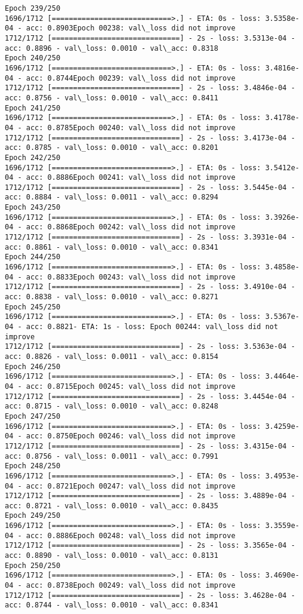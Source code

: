 \documentclass[11pt]{article}
\begin{document}
\begin{Verbatim}[commandchars=\\\{\}]
Epoch 239/250
1696/1712 [============================>.] - ETA: 0s - loss: 3.5358e-04 - acc: 0.8903Epoch 00238: val\_loss did not improve
1712/1712 [==============================] - 2s - loss: 3.5313e-04 - acc: 0.8896 - val\_loss: 0.0010 - val\_acc: 0.8318
Epoch 240/250
1696/1712 [============================>.] - ETA: 0s - loss: 3.4816e-04 - acc: 0.8744Epoch 00239: val\_loss did not improve
1712/1712 [==============================] - 2s - loss: 3.4846e-04 - acc: 0.8756 - val\_loss: 0.0010 - val\_acc: 0.8411
Epoch 241/250
1696/1712 [============================>.] - ETA: 0s - loss: 3.4178e-04 - acc: 0.8785Epoch 00240: val\_loss did not improve
1712/1712 [==============================] - 2s - loss: 3.4173e-04 - acc: 0.8785 - val\_loss: 0.0010 - val\_acc: 0.8201
Epoch 242/250
1696/1712 [============================>.] - ETA: 0s - loss: 3.5412e-04 - acc: 0.8886Epoch 00241: val\_loss did not improve
1712/1712 [==============================] - 2s - loss: 3.5445e-04 - acc: 0.8884 - val\_loss: 0.0011 - val\_acc: 0.8294
Epoch 243/250
1696/1712 [============================>.] - ETA: 0s - loss: 3.3926e-04 - acc: 0.8868Epoch 00242: val\_loss did not improve
1712/1712 [==============================] - 2s - loss: 3.3931e-04 - acc: 0.8861 - val\_loss: 0.0010 - val\_acc: 0.8341
Epoch 244/250
1696/1712 [============================>.] - ETA: 0s - loss: 3.4858e-04 - acc: 0.8833Epoch 00243: val\_loss did not improve
1712/1712 [==============================] - 2s - loss: 3.4910e-04 - acc: 0.8838 - val\_loss: 0.0010 - val\_acc: 0.8271
Epoch 245/250
1696/1712 [============================>.] - ETA: 0s - loss: 3.5367e-04 - acc: 0.8821- ETA: 1s - loss: Epoch 00244: val\_loss did not improve
1712/1712 [==============================] - 2s - loss: 3.5363e-04 - acc: 0.8826 - val\_loss: 0.0011 - val\_acc: 0.8154
Epoch 246/250
1696/1712 [============================>.] - ETA: 0s - loss: 3.4464e-04 - acc: 0.8715Epoch 00245: val\_loss did not improve
1712/1712 [==============================] - 2s - loss: 3.4454e-04 - acc: 0.8715 - val\_loss: 0.0010 - val\_acc: 0.8248
Epoch 247/250
1696/1712 [============================>.] - ETA: 0s - loss: 3.4259e-04 - acc: 0.8750Epoch 00246: val\_loss did not improve
1712/1712 [==============================] - 2s - loss: 3.4315e-04 - acc: 0.8756 - val\_loss: 0.0011 - val\_acc: 0.7991
Epoch 248/250
1696/1712 [============================>.] - ETA: 0s - loss: 3.4953e-04 - acc: 0.8721Epoch 00247: val\_loss did not improve
1712/1712 [==============================] - 2s - loss: 3.4889e-04 - acc: 0.8721 - val\_loss: 0.0010 - val\_acc: 0.8435
Epoch 249/250
1696/1712 [============================>.] - ETA: 0s - loss: 3.3559e-04 - acc: 0.8886Epoch 00248: val\_loss did not improve
1712/1712 [==============================] - 2s - loss: 3.3565e-04 - acc: 0.8890 - val\_loss: 0.0010 - val\_acc: 0.8131
Epoch 250/250
1696/1712 [============================>.] - ETA: 0s - loss: 3.4690e-04 - acc: 0.8738Epoch 00249: val\_loss did not improve
1712/1712 [==============================] - 2s - loss: 3.4628e-04 - acc: 0.8744 - val\_loss: 0.0010 - val\_acc: 0.8341

    \end{Verbatim}
\end{document}
